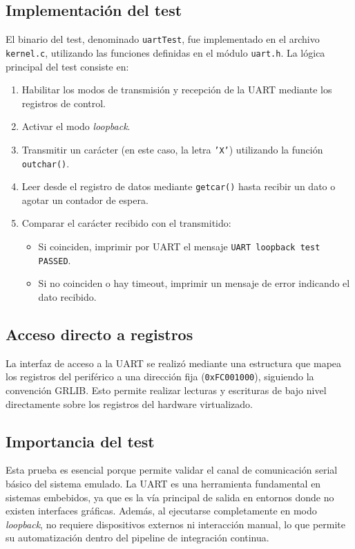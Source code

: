 \subsection*{Implementación del test}

El binario del test, denominado \texttt{uartTest}, fue implementado en el archivo \texttt{kernel.c}, utilizando las funciones definidas en el módulo \texttt{uart.h}. La lógica principal del test consiste en:

\begin{enumerate}
    \item Habilitar los modos de transmisión y recepción de la UART mediante los registros de control.
    \item Activar el modo \emph{loopback}.
    \item Transmitir un carácter (en este caso, la letra \texttt{'X'}) utilizando la función \texttt{outchar()}.
    \item Leer desde el registro de datos mediante \texttt{getcar()} hasta recibir un dato o agotar un contador de espera.
    \item Comparar el carácter recibido con el transmitido:
    \begin{itemize}
        \item Si coinciden, imprimir por UART el mensaje \texttt{UART loopback test PASSED}.
        \item Si no coinciden o hay timeout, imprimir un mensaje de error indicando el dato recibido.
    \end{itemize}
\end{enumerate}

\subsection*{Acceso directo a registros}

La interfaz de acceso a la UART se realizó mediante una estructura que mapea los registros del periférico a una dirección fija (\texttt{0xFC001000}), siguiendo la convención GRLIB. Esto permite realizar lecturas y escrituras de bajo nivel directamente sobre los registros del hardware virtualizado.

\subsection*{Importancia del test}

Esta prueba es esencial porque permite validar el canal de comunicación serial básico del sistema emulado. La UART es una herramienta fundamental en sistemas embebidos, ya que es la vía principal de salida en entornos donde no existen interfaces gráficas. Además, al ejecutarse completamente en modo \emph{loopback}, no requiere dispositivos externos ni interacción manual, lo que permite su automatización dentro del pipeline de integración continua.

